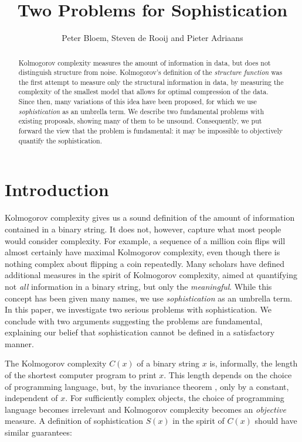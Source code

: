 \documentclass{style/llncs}
\title{Two Problems for Sophistication}
\author{Peter Bloem, Steven de Rooij and Pieter Adriaans}
\institute{
  System and Network Engineering Group, \\University of Amsterdam, the Netherlands\\
  \email{uva@peterbloem.nl, steven.de.rooij@gmail.com, p.w.adriaans@uva.nl}
}
\begin{document}
 
\maketitle

\begin{abstract}
Kolmogorov complexity measures the amount of information in data, but does not distinguish structure from noise. Kolmogorov's definition of the \emph{structure function} was the first attempt to measure only the structural information in data, by measuring the complexity of the smallest model that allows for optimal compression of the data. Since then, many variations of this idea have been proposed, for which we use \emph{sophistication} as an umbrella term. We describe two fundamental problems with existing proposals, showing many of them to be unsound. Consequently, we put forward the view that the problem is fundamental: it may be impossible to objectively quantify the sophistication.
\end{abstract}

\section{Introduction}\enlargethispage{3\baselineskip}

Kolmogorov complexity gives us a sound definition of the amount of information contained in a binary string. It does not, however, capture what most people would consider complexity. For example, a sequence of a million coin flips will almost certainly have maximal Kolmogorov complexity, even though there is nothing complex about flipping a coin repeatedly. Many scholars have defined additional measures in the spirit of Kolmogorov complexity, aimed at quantifying not \emph{all} information in a binary string, but only the \emph{meaningful}. While this concept has been given many names, we use \emph{sophistication} as an umbrella term. In this paper, we investigate two serious problems with sophistication. We conclude with two arguments suggesting the problems are fundamental, explaining our belief that sophistication cannot be defined in a satisfactory manner.

The Kolmogorov complexity $C(x)$ of a binary string $x$ is, informally, the length of the shortest computer program to print $x$. This length depends on the choice of programming language, but, by the invariance theorem \cite[Section~2.1]{li1993introduction}, only by a constant, independent of $x$. For sufficiently complex objects, the choice of programming language becomes irrelevant and Kolmogorov complexity becomes an \emph{objective} measure. A definition of sophistication $S(x)$ in the spirit of $C(x)$ should have similar guarantees:
\end{document}
